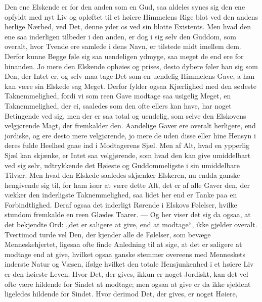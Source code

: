 \documentclass[12pt,a4paper]{book}
\newcommand{\apage}[1]{\marginnote{\footnotesize\textit{[#1]}}}
\begin{document}
Den ene Elskende er for den anden som en Gud, saa aldeles synes sig den
ene opfyldt med nyt Liv og opløftet til et høiere Himmelens Rige blot
ved den andens herlige Nærhed, ved Det, denne yder os ved sin blotte
Existents. Men hvad den ene saa inderligen tilbeder i den anden, er dog
i sig selv den Guddom, som overalt, hvor Tvende ere samlede i dens
Navn, er tilstede midt imellem dem. Derfor kunne Begge føle sig saa
uendeligen ydmyge, saa meget de end ere for \apage{24} hinanden. Jo mere den
Elskende ophøies og prises, desto dybere føler han sig som Den, der
Intet er, og selv maa tage Det som en uendelig Himmelens Gave, a han
kan være sin Elskede sag Meget. Derfor fylder ogsaa Kjærlighed med den
sødeste Taknemmelighed, fordi vi som reen Gave modtage saa usigelig
Meget, en Taknemmelighed, der ei, saaledes som den ofte ellers kan
have, har noget Betingende ved sig, men der er saa total og uendelig,
som selve den Elskovens velgjørende Magt, der fremkalder den. Aandelige
Gaver ere overalt herligere, end jordiske, og ere desto mere
velgjørende, jo mere de uden disse eller hine Hensyn i deres fulde
Heelhed gaae ind i Modtagerens Sjæl. Men af Alt, hvad en ypperlig Sjæl
kan skjænke, er Intet saa velgjørende, som hvad den kan give
umiddelbart ved sig selv, udtrykkende det Høieste og Guddommeligste i
sin umiddelbare Tilvær. Men hvad den Elskede saaledes skjænker
Elskeren, nu endda ganske hengivende sig til, for ham især at være
dette Alt, det er af alle Gaver den, der vækker den inderligste
Taknemmelighed, saa lidet her end er Tanke paa en Forbindtlighed. Deraf
ogsaa det inderligt Rørende i Elskovs Følelser, hvilke stundom
fremkalde en reen Glædes Taarer. --- Og her viser det sig da ogsaa, at
det bekjendte Ord: „det er saligere at give, end at modtage“, ikke
gjelder overalt. Tvertimod turde vel Den, der kjender alle de Følelser,
som bevæge Menneskehjertet, ligesaa ofte finde Anledning til at sige,
at det er saligere at modtage \apage{25} end at give, hvilket ogsaa ganske stemmer
overeens med Menneskets inderste Natur og Væsen, ifølge hvilket den
totale Hensjunkenhed i et høiere Liv er den høieste Leven. Hvor Det,
der gives, ikkun er noget Jordiskt, kan det vel ofte være hildende for
Sindet at modtage; men ogsaa at give er da ikke sjeldent ligeledes
hildende for Sindet. Hvor derimod Det, der gives, er noget Høiere,
\end{document}

